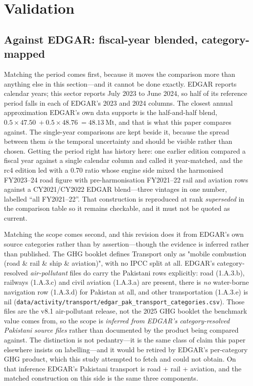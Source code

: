 \section{Validation}
\label{sec:validation}

\subsection{Against EDGAR: fiscal-year blended, category-mapped}

Matching the period comes first, because it moves the comparison more than anything else
in this section---and it cannot be done exactly. EDGAR reports calendar years; this
sector reports July 2023 to June 2024, so half of its reference period falls in each of
EDGAR's 2023 and 2024 columns. The closest annual approximation EDGAR's own data
supports is the half-and-half blend,
$0.5 \times \SI{47.50}{} + 0.5 \times \SI{48.76}{} = \SI{48.13}{\mega\tonne}$, and that
is what this paper compares against. The single-year comparisons are kept beside it,
because the spread between them \emph{is} the temporal uncertainty and should be visible
rather than chosen. Getting the period right has history here: one earlier edition
compared a fiscal year against a single calendar column and called it year-matched, and
the rc4 edition led with a \num{0.70} ratio whose engine side mixed the harmonised
FY2023--24 road figure with pre-harmonisation FY2021--22 rail and aviation rows against
a CY2021/CY2022 EDGAR blend---three vintages in one number, labelled ``all FY2021--22''.
That construction is reproduced at rank \emph{superseded} in the comparison table so it
remains checkable, and it must not be quoted as current.

Matching the scope comes second, and this revision does it from EDGAR's own source
categories rather than by assertion---though the evidence is inferred rather than
published. The GHG booklet defines Transport only as "mobile combustion (road \& rail \&
ship \& aviation)", with no IPCC split at all. EDGAR's category-resolved
\emph{air-pollutant} files do carry the Pakistani rows explicitly: road (1.A.3.b),
railways (1.A.3.c) and civil aviation (1.A.3.a) are present, there is \emph{no}
water-borne navigation row (1.A.3.d) for Pakistan at all, and other transportation
(1.A.3.e) is nil
(\texttt{data/activity/transport/edgar\_pak\_transport\_categories.csv}). Those files are
the v8.1 air-pollutant release, not the 2025 GHG booklet the benchmark value comes from,
so the scope is \emph{inferred from EDGAR's category-resolved Pakistani source files}
rather than documented by the product being compared against. The distinction is not
pedantry---it is the same class of claim this paper elsewhere insists on labelling---and
it would be retired by EDGAR's per-category GHG product, which this study attempted to
fetch and could not obtain. On that inference EDGAR's Pakistani transport is road + rail
+ aviation, and the matched construction on this side is the same three components.

